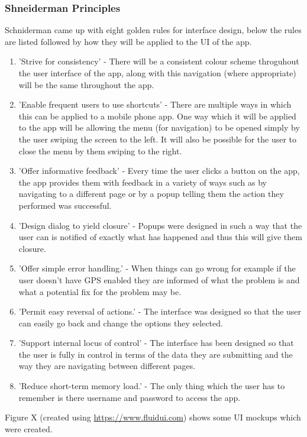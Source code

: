 \subsubsection{Shneiderman Principles}
Schniderman came up with eight golden rules for interface design, below the rules are listed followed by how they will be applied to the UI of the app. \cite{sch}
\begin{enumerate}
	\item 'Strive for consistency' - There will be a consistent colour scheme throguhout the user interface of the app, along with this navigation (where appropriate) will be the same throughout the app.
	\item 'Enable frequent users to use shortcuts' - There are multiple ways in which this can be applied to a mobile phone app. One way which it will be applied to the app will be allowing the menu (for navigation) to be opened simply by the user swiping the screen to the left. It will also be possible for the user to close the menu by them swiping to the right.
	\item 'Offer informative feedback' - Every time the user clicks a button on the app, the app provides them with feedback in a variety of ways such as by navigating to a different page or by a popup telling them the action they performed was successful.
	\item 'Design dialog to yield closure' - Popups were designed in such a way that the user can is notified of exactly what has happened and thus this will give them closure.
	\item 'Offer simple error handling.' - When things can go wrong for example if the user doesn't have GPS enabled they are informed of what the problem is and what a potential fix for the problem may be.
	\item 'Permit easy reversal of actions.' - The interface was designed so that the user can easily go back and change the options they selected.
	\item 'Support internal locus of control' - The interface has been designed so that the user is fully in control in terms of the data they are submitting and the way they are navigating between different pages.
	\item 'Reduce short-term memory load.' - The only thing which the user has to remember is there username and password to access the app.
\end{enumerate}
Figure X (created using \url {https://www.fluidui.com}) shows some UI mockups which were created.
